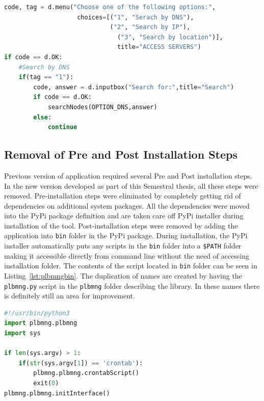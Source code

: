 \begin{minipage}{\linewidth}
\begin{lstlisting}[language=Python, numbers=none, label={lst:constant}, caption=Example of Constant Usage, frame=single, showstringspaces=false, breaklines=true]
code, tag = d.menu("Choose one of the following options:",
					choices=[("1", "Serach by DNS"),
				      		 ("2", "Search by IP"),
					    	   ("3", "Search by location")],
						       title="ACCESS SERVERS")
if code == d.OK:
	#Search by DNS
	if(tag == "1"):
		code, answer = d.inputbox("Search for:",title="Search")
		if code == d.OK:
			searchNodes(OPTION_DNS,answer)
		else:
			continue
\end{lstlisting}
\end{minipage}

\subsection{Removal of Pre and Post Installation Steps}
Previous version of application required several Pre and Post installation steps. In the new version developed as part of this Semestral thesis, all these steps were removed. Pre-installation steps were eliminated by completely getting rid of dependencies on additional system packages. All the dependencies were moved into the PyPi package definition and are taken care off PyPi installer during installation of the tool. Post-installation steps were removed by adding the application into \texttt{bin} folder in the PyPi package. During installation, the PyPi installer automatically puts any scripts in the \texttt{bin} folder into a \texttt{\$PATH} folder making it accessible directly from command line without the need of accessing installation folder. The contents of the script located in \texttt{bin} folder can be seen in Listing~\ref{lst:plbmngbin}. The duplication of names are created by having the \texttt{plbmng.py} script in the \texttt{plbmng} folder describing the library. In these names there is definitely still an area for improvement.

\begin{minipage}{\linewidth}
\begin{lstlisting}[language=Python, numbers=none, label={lst:plbmngbin}, caption=Plbmng Script Located in BIN, frame=single, showstringspaces=false, breaklines=true]
#!/usr/bin/python3
import plbmng.plbmng
import sys

if len(sys.argv) > 1:
	if(str(sys.argv[1]) == 'crontab'):
		plbmng.plbmng.crontabScript()
		exit(0)
plbmng.plbmng.initInterface()
\end{lstlisting}
\end{minipage}

